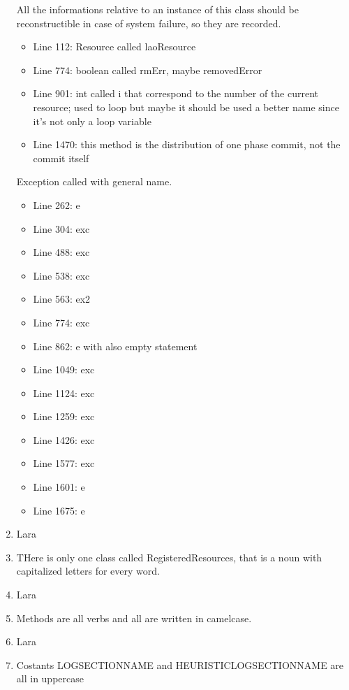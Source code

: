 \begin{enumerate}
	All the informations relative to an instance of this class should be reconstructible in case of system failure, so they are recorded.
	\begin{itemize}
		\item Line 112: Resource called laoResource
		\item Line 774: boolean called rmErr, maybe removedError
		\item Line 901: int called i that correspond to the number of the current resource; used to loop but maybe it should be used a better name since it's not only a loop variable
		\item Line 1470: this method is the distribution of one phase commit, not the commit itself
	\end{itemize}
	Exception called with general name.
	\begin{itemize}
		\item Line 262: e
		\item Line 304: exc
		\item Line 488: exc
		\item Line 538: exc
		\item Line 563: ex2
		\item Line 774: exc
		\item Line 862: e with also empty statement
		\item Line 1049: exc
		\item Line 1124: exc
		\item Line 1259: exc
		\item Line 1426: exc
		\item Line 1577: exc
		\item Line 1601: e
		\item Line 1675: e
	\end{itemize}
	\item Lara
	\item THere is only one class called RegisteredResources, that is a noun with capitalized letters for every word.
	\item Lara
	\item Methods are all verbs and all are written in camelcase.
	\item Lara
	\item Costants LOG\textunderscore SECTION\textunderscore NAME and HEURISTIC\textunderscore LOG\textunderscore SECTION\textunderscore NAME are all in uppercase
\end{enumerate}
